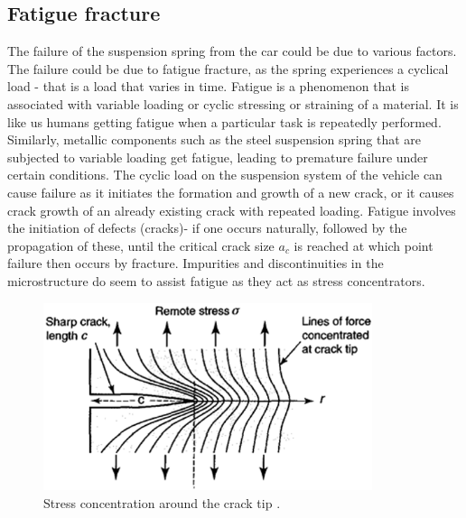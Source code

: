 \documentclass[11pt]{article}
\begin{document}
\subsection{Fatigue fracture}
The failure of the suspension spring from the car could be due to various factors. The failure could be due to fatigue fracture, as the spring experiences a cyclical load - that is a load that varies in time. Fatigue is a phenomenon that is associated with variable loading or cyclic stressing or straining of a material. It is like us humans getting fatigue when a particular task is repeatedly performed. Similarly, metallic components such as the steel suspension spring that are subjected to variable loading get fatigue, leading to premature failure under certain conditions. The cyclic load on the suspension system of the vehicle can cause failure as it initiates the formation and growth of a new crack, or it causes crack growth of an already existing crack with repeated loading. Fatigue involves the initiation of defects (cracks)- if one occurs naturally, followed by the propagation of these, until the critical crack size $a_c$ is reached at which point failure then occurs by fracture. Impurities and discontinuities in the microstructure do seem to assist fatigue as they act as stress concentrators. 
 \begin{figure}[H]
    \centering
    \includegraphics[height = 5.5cm]{./img/stress1.png}
    \caption{Stress concentration around the crack tip \cite{b13}.}
    \label{fig:stress2}
\end{figure}
\end{document}
